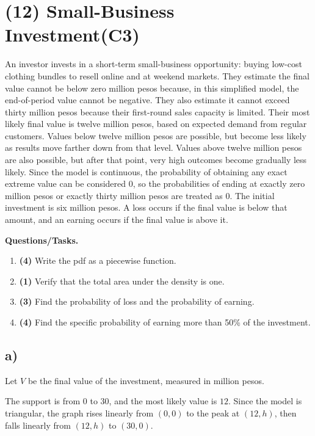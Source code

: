 \section{(12) Small-Business Investment(C3)}


An investor invests in a short-term small-business opportunity: buying low-cost clothing bundles to resell online and at weekend markets. They estimate the final value cannot be below zero million pesos because, in this simplified model, the end-of-period value cannot be negative. They also estimate it cannot exceed thirty million pesos because their first-round sales capacity is limited. Their most likely final value is twelve million pesos, based on expected demand from regular customers. Values below twelve million pesos are possible, but become less likely as results move farther down from that level. Values above twelve million pesos are also possible, but after that point, very high outcomes become gradually less likely. Since the model is continuous, the probability of obtaining any exact extreme value can be considered $0$, so the probabilities of ending at exactly zero million pesos or exactly thirty million pesos are treated as $0$. The initial investment is six million pesos. A loss occurs if the final value is below that amount, and an earning occurs if the final value is above it.

\textbf{Questions/Tasks.}
\begin{enumerate}[label=\textbf{\alph*)}]
	\item \textbf{(4)} Write the pdf as a piecewise function.
	\item \textbf{(1)} Verify that the total area under the density is one.
	\item \textbf{(3)} Find the probability of loss and the probability of earning.
	\item \textbf{(4)} Find the specific probability of earning more than 50\% of the investment.
\end{enumerate}

\subsection*{a)}
Let $V$ be the final value of the investment, measured in million pesos.

The support is from $0$ to $30$, and the most likely value is $12$. Since the model is triangular, the graph rises linearly from $(0,0)$ to the peak at $(12,h)$, then falls linearly from $(12,h)$ to $(30,0)$.

